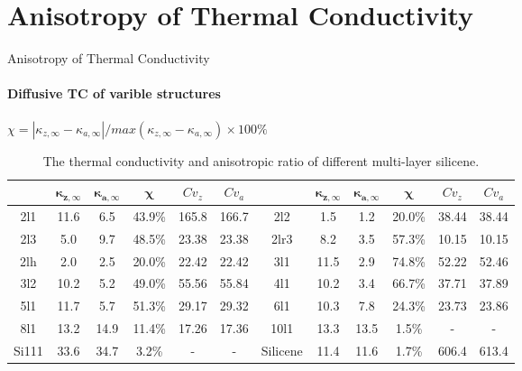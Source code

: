\documentclass{beamer}
\begin{document}
\section{Anisotropy of Thermal Conductivity}
\begin{frame}{Anisotropy of Thermal Conductivity}
  \framesubtitle{Diffusive TC of varible structures}%
  $ \chi=|\kappa_{z,\infty}-\kappa_{a,\infty} |/max⁡(\kappa_{z,\infty}-\kappa_{a,\infty} ) \times 100 \%$
  \begin{table}[!b]
    \tiny
    {\carlitoTLF %
      \begin{tabular}{cccccccccccc}
              & \textbf{$\mathbf{\kappa_{z,\infty}}$}
              & \textbf{$\mathbf{\kappa_{a,\infty}}$}
              & \textbf{$\mathbf{\chi}$}
              & $Cv_{z}$
              & $Cv_{a}$
              &
              & \textbf{$\mathbf{\kappa_{z,\infty}}$}
              & \textbf{$\mathbf{\kappa_{a,\infty}}$}
              & \textbf{$\mathbf{\chi}$}
              & $Cv_{z}$
              & $Cv_{a}$                                                                                                                \\
        \toprule
        2l1   & 11.6                                  & 6.5  & 43.9\% & 165.8 & 166.7 & 2l2      & 1.5  & 1.2  & 20.0\% & 38.44 & 38.44 \\
        2l3   & 5.0                                   & 9.7  & 48.5\% & 23.38 & 23.38 & 2lr3     & 8.2  & 3.5  & 57.3\% & 10.15 & 10.15 \\
        2lh   & 2.0                                   & 2.5  & 20.0\% & 22.42 & 22.42 & 3l1      & 11.5 & 2.9  & 74.8\% & 52.22 & 52.46 \\
        3l2   & 10.2                                  & 5.2  & 49.0\% & 55.56 & 55.84 & 4l1      & 10.2 & 3.4  & 66.7\% & 37.71 & 37.89 \\
        5l1   & 11.7                                  & 5.7  & 51.3\% & 29.17 & 29.32 & 6l1      & 10.3 & 7.8  & 24.3\% & 23.73 & 23.86 \\
        8l1   & 13.2                                  & 14.9 & 11.4\% & 17.26 & 17.36 & 10l1     & 13.3 & 13.5 & 1.5\%  & -     & -     \\
        Si111 & 33.6                                  & 34.7 & 3.2\%  & -     & -     & Silicene & 11.4 & 11.6 & 1.7\%  & 606.4 & 613.4 \\
        \bottomrule
      \end{tabular}
    }
    \caption{
      The thermal conductivity and anisotropic ratio of different multi-layer silicene.}
  \end{table}

\end{frame}
\end{document}
